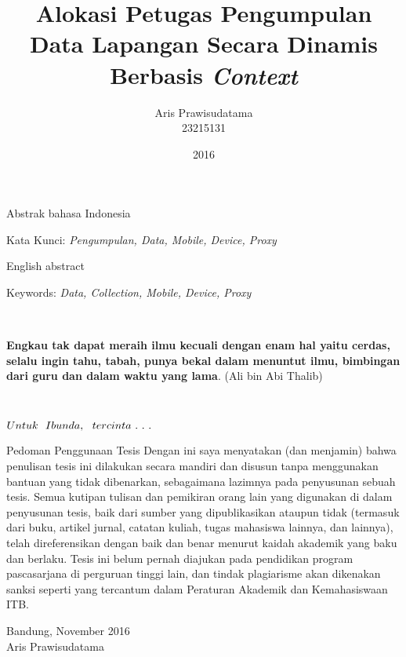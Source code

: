 \documentclass[12pt,a4paper,oneside]{book}
\title{Alokasi Petugas Pengumpulan Data Lapangan Secara Dinamis Berbasis \textit{Context}}
\author{Aris Prawisudatama\\23215131}
\date{2016}
\numberwithin{equation}{chapter}
\begin{document}
\frontmatter
{}
\makecustompengesahan

\begin{abstrak}[indo]
Abstrak bahasa Indonesia

Kata Kunci: \textit{Pengumpulan, Data, Mobile, Device, Proxy}

\end{abstrak}
\begin{abstrak}[english]
English abstract
  
Keywords: \textit{Data, Collection, Mobile, Device, Proxy}
\end{abstrak}

\
\vspace{5cm}

\begin{center}
\textbf{Engkau tak dapat meraih ilmu kecuali dengan enam hal yaitu cerdas, selalu ingin tahu, tabah, punya bekal dalam menuntut ilmu, bimbingan dari guru dan dalam waktu yang lama}.
(Ali bin Abi Thalib)
\end{center}

\
\vspace{9cm}

\begin{flushright}
\textbf{\large{$\mathnormal{Untuk \  \ Ibunda, \ \ tercinta \ . \ . \ .}$}}
\end{flushright}


    
\begin{custompage}{Pedoman Penggunaan Tesis}
Dengan ini saya menyatakan (dan menjamin) bahwa penulisan tesis ini dilakukan secara mandiri dan disusun tanpa menggunakan bantuan yang tidak dibenarkan, sebagaimana lazimnya pada penyusunan sebuah tesis. Semua kutipan tulisan dan pemikiran orang lain yang digunakan di dalam penyusunan tesis, baik dari sumber yang dipublikasikan ataupun tidak (termasuk dari buku, artikel jurnal, catatan kuliah, tugas mahasiswa lainnya, dan lainnya), telah direferensikan dengan baik dan benar menurut kaidah akademik yang baku dan berlaku. Tesis ini belum pernah diajukan pada pendidikan program pascasarjana di perguruan tinggi lain, dan tindak plagiarisme akan dikenakan sanksi seperti yang tercantum dalam Peraturan Akademik dan Kemahasiswaan ITB.

\begin{flushright}
Bandung, November 2016\\[2cm]
Aris Prawisudatama
\end{flushright} 
\end{custompage}
\end{document}
